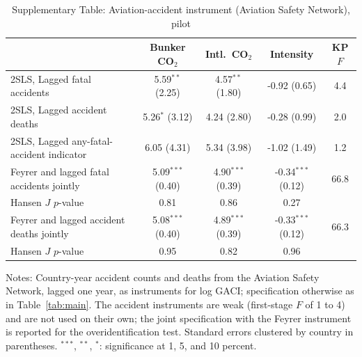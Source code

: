 \begin{table}[htbp]
\centering
\begin{threeparttable}
\caption{Supplementary Table: Aviation-accident instrument (Aviation Safety Network), pilot}
\label{tab:accident_iv}
\footnotesize
\begin{tabular}{lcccc}
\toprule
 & Bunker CO$_2$ & Intl.\ CO$_2$ & Intensity & KP $F$ \\
\midrule
  2SLS, Lagged fatal accidents & 5.59$^{**}$ (2.25) & 4.57$^{**}$ (1.80) & -0.92 (0.65) & 4.4 \\
  2SLS, Lagged accident deaths & 5.26$^{*}$ (3.12) & 4.24 (2.80) & -0.28 (0.99) & 2.0 \\
  2SLS, Lagged any-fatal-accident indicator & 6.05 (4.31) & 5.34 (3.98) & -1.02 (1.49) & 1.2 \\
  Feyrer and lagged fatal accidents jointly & 5.09$^{***}$ (0.40) & 4.90$^{***}$ (0.39) & -0.34$^{***}$ (0.12) & 66.8 \\
  \quad Hansen $J$ $p$-value & 0.81 & 0.86 & 0.27 & \\
  Feyrer and lagged accident deaths jointly & 5.08$^{***}$ (0.40) & 4.89$^{***}$ (0.39) & -0.33$^{***}$ (0.12) & 66.3 \\
  \quad Hansen $J$ $p$-value & 0.95 & 0.82 & 0.96 & \\
\bottomrule
\end{tabular}
\begin{tablenotes}[flushleft]
\footnotesize
\item Notes: Country-year accident counts and deaths from the Aviation Safety Network, lagged one year, as instruments for log GACI; specification otherwise as in Table~\ref{tab:main}. The accident instruments are weak (first-stage $F$ of 1 to 4) and are not used on their own; the joint specification with the Feyrer instrument is reported for the overidentification test. Standard errors clustered by country in parentheses. $^{***}$, $^{**}$, $^{*}$: significance at 1, 5, and 10 percent.
\end{tablenotes}
\end{threeparttable}
\end{table}

